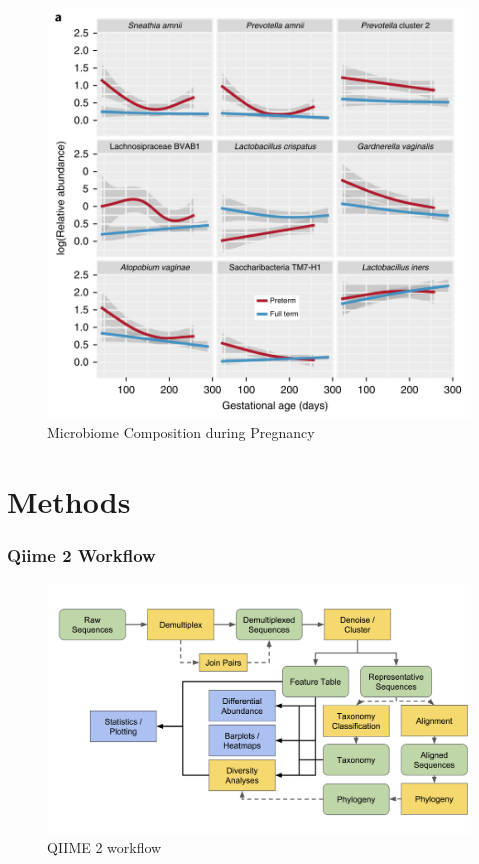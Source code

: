\documentclass{beamer}
\begin{document}
\begin{frame}[allowframebreaks]
        \begin{figure}
            \includegraphics[width=0.5 \linewidth]{figures/Literature/HMP/gestational.png}
            \caption{Microbiome Composition during Pregnancy}
        \end{figure}
    \end{frame}

    \section{Methods}
    \begin{frame}
        \frametitle{Qiime 2 Workflow}

        \begin{figure}[h!]
            \includegraphics[width=0.8 \linewidth]{figures/qiime.png}
            \caption{QIIME 2 workflow \protect \cite{qiime1, qiime2, qiime3}}
        \end{figure}
    \end{frame}
\end{document}
